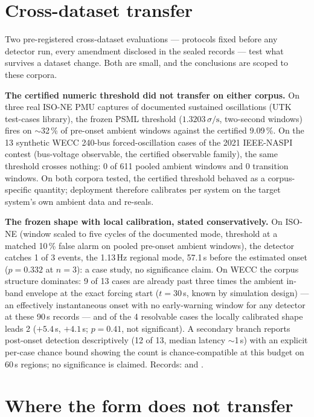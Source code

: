 \documentclass[journal]{IEEEtran}
\begin{document}
\section{Cross-dataset transfer}\label{sec:portability}

Two pre-registered cross-dataset evaluations --- protocols fixed before
any detector run, every amendment disclosed in the sealed records ---
test what survives a dataset change. Both are small, and the
conclusions are scoped to these corpora.

\textbf{The certified numeric threshold did not transfer on either
corpus.} On three real ISO-NE PMU captures of documented sustained
oscillations (UTK test-cases library), the frozen PSML threshold
($1.3203\,\sigma/\mathrm{s}$, two-second windows) fires on
$\sim$32\,\% of pre-onset ambient windows against the certified
9.09\,\%. On the 13 synthetic WECC 240-bus forced-oscillation cases of
the 2021 IEEE-NASPI contest (bus-voltage observable, the certified
observable family), the same threshold crosses nothing: 0 of 611 pooled
ambient windows and 0 transition windows. On both corpora tested, the
certified threshold behaved as a corpus-specific quantity; deployment
therefore calibrates per system on the target system's own ambient data
and re-seals.

\textbf{The frozen shape with local calibration, stated
conservatively.} On ISO-NE (window scaled to five cycles of the
documented mode, threshold at a matched 10\,\% false alarm on pooled
pre-onset ambient windows), the detector catches 1 of 3 events, the
1.13\,Hz regional mode, 57.1\,s before the estimated onset
($p = 0.332$ at $n = 3$): a case study, no significance claim. On WECC
the corpus structure dominates: 9 of 13 cases are already past three
times the ambient in-band envelope at the exact forcing start
($t = 30$\,s, known by simulation design) --- an effectively
instantaneous onset with no early-warning window for any detector at
these 90\,s records --- and of the 4 resolvable cases the locally
calibrated shape leads 2 ($+5.4$\,s, $+4.1$\,s; $p = 0.41$, not
significant). A secondary branch reports post-onset detection
descriptively (12 of 13, median latency $\sim$1\,s) with an explicit
per-case chance bound showing the count is chance-compatible at this
budget on 60\,s regions; no significance is claimed. Records:
 and
.

\section{Where the form does not transfer}\label{sec:boundaries}
\end{document}
